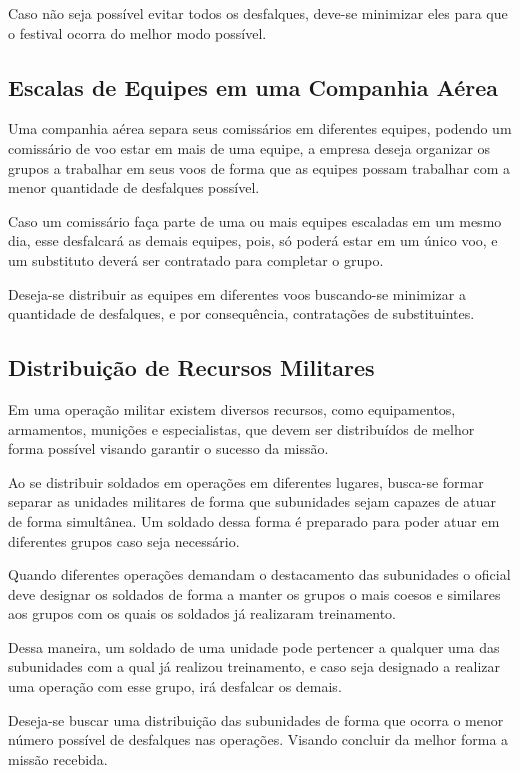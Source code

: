 Caso não seja possível evitar todos os desfalques, deve-se minimizar eles para que o festival ocorra do melhor modo possível.

\subsection{Escalas de Equipes em uma Companhia Aérea}
Uma companhia aérea separa seus comissários em diferentes equipes, podendo um comissário de voo estar em mais de uma equipe, a empresa deseja organizar os grupos a trabalhar em seus voos de forma que as equipes possam trabalhar com a menor quantidade de desfalques possível.

Caso um comissário faça parte de uma ou mais equipes escaladas em um mesmo dia, esse desfalcará as demais equipes, pois, só poderá estar em um único voo, e um substituto deverá ser contratado para completar o grupo.

Deseja-se distribuir as equipes em diferentes voos buscando-se minimizar a quantidade de desfalques, e por consequência, contratações de substituintes.

\subsection{Distribuição de Recursos Militares}
Em uma operação militar existem diversos recursos, como equipamentos, armamentos, munições e especialistas, que devem ser distribuídos de melhor forma possível visando garantir o sucesso da missão.

Ao se distribuir soldados em operações em diferentes lugares, busca-se formar separar as unidades militares de forma que subunidades sejam capazes de atuar de forma simultânea. Um soldado dessa forma é preparado para poder atuar em diferentes grupos caso seja necessário.

Quando diferentes operações demandam o destacamento das subunidades o oficial deve designar os soldados de forma a manter os grupos o mais coesos e similares aos grupos com os quais os soldados já realizaram treinamento.

Dessa maneira, um soldado de uma unidade pode pertencer a qualquer uma das subunidades com a qual já realizou treinamento, e caso seja designado a realizar uma operação com esse grupo, irá desfalcar os demais.

Deseja-se buscar uma distribuição das subunidades de forma que ocorra o menor número possível de desfalques nas operações. Visando concluir da melhor forma a missão recebida.
